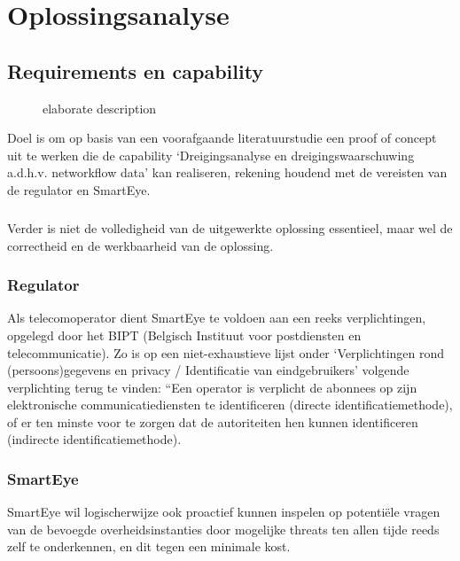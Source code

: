 \chapter{Oplossingsanalyse}

\section{Requirements en capability}

\begin{figure}[!htbp]
    
    \caption[short description]{elaborate description}
    \label{fig:RequirementsCapability}
\end{figure}

Doel is om op basis van een voorafgaande literatuurstudie een proof of concept uit te werken die de capability ‘Dreigingsanalyse en dreigingswaarschuwing a.d.h.v. networkflow data’ kan realiseren, rekening houdend met de vereisten van de regulator en SmartEye.

\paragraph{}
Verder is niet de volledigheid van de uitgewerkte oplossing essentieel, maar wel de correctheid en de werkbaarheid van de oplossing.

\subsection{Regulator}
Als telecomoperator dient SmartEye te voldoen aan een reeks verplichtingen, opgelegd door het BIPT (Belgisch Instituut voor postdiensten en telecommunicatie). Zo is op een niet-exhaustieve lijst onder ‘Verplichtingen rond (persoons)gegevens en privacy / Identificatie van eindgebruikers’ volgende verplichting terug te vinden: “Een operator is verplicht de abonnees op zijn elektronische communicatiediensten te identificeren (directe identificatiemethode), of er ten minste voor te zorgen dat de autoriteiten hen kunnen identificeren (indirecte identificatiemethode).

\subsection{SmartEye}
SmartEye wil logischerwijze ook proactief kunnen inspelen op potentiële vragen van de bevoegde overheidsinstanties door mogelijke threats ten allen tijde reeds zelf te onderkennen, en dit tegen een minimale kost.

